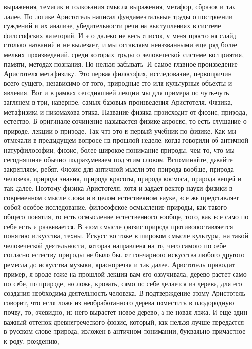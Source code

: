 выражения, тематик и толкования смысла выражения, метафор, образов и так далее.
По логике Аристотель написал фундаментальные труды о построении суждений и их
анализе, убедительности речи на выступлениях в системе философских категорий. И
это далеко не весь список, у меня просто на слайд столько названий и не
вылезает, и мы оставляем неназванными еще ряд более мелких произведений, среди
которых труды о человеческой системе восприятия, памяти, методах познания. Но
нельзя забывать. И самое главное произведение Аристотеля метафизику. Это первая
философия, исследование, первопричин всего сущего, независимо от того, природные
это или культурные объекты и явления. Вот и в рамках сегодняшней лекции мы для
примера по чуть-чуть заглянем в три, наверное, самых базовых произведения
Аристотеля. Физика, метафизика и никомахова этика. Название физика происходит от
фюзис, природа, естество. В оригинале сочинение называется физике акросис, то
есть слушание о природе, лекции о природе. Так что это и первый учебник по
физике. Как мы отмечали в предыдущем вопросе на прошлой неделе, когда говорили
об античной натурфилософии, фюзис, более широкое понимание природы, чем то, что
мы сегодняшние обычно подразумеваем под этим словом. Вспоминайте, давайте
закрепляем, ребят. Фюзис для античной мысли это природа вообще, природа
человека, природа знания, природа красоты, природа космоса, природа вещей и так
далее. Поэтому физика Аристотеля, хотя и задает вектор науки физики в
современном смысле слова и в целом естественном науке, все же представляет собой
особое исследование, философское осмысление природы, как такого общего понятия,
то есть осмысление естественного вообще, того, как все само по себе есть и
развивается. В этом смысле фюзис природа противопоставляется понятию искусства,
техны. Искусство тоже в широком смысле культуры, на такой человеческой
деятельности, которая направлена на то, чего самого по себе согласно естеству
природы не было бы. от гончарного искусства любого другого ремесла до искусства
музыки, красноречия и так далее. Аристотель приводит пример, я вроде тоже на
прошлой лекции вам его озвучивала, дерево растет само по себе, по природе, но
ложе, кровать, само по себе делается из дерева, для его создания необходима
деятельность человека. В подтверждение этому Аристотель говорит, что если ложе
из необработанного дерева поместить в плодородную почву, то, очевидно, из него
вырастет новое дерево, а не новая ложа. И еще один важный оттенок
древнегреческого фюзис, который, как нельзя лучше передается в русском слове
природа, изложен в античном понимании, буквально причастное к роду, рождению,

